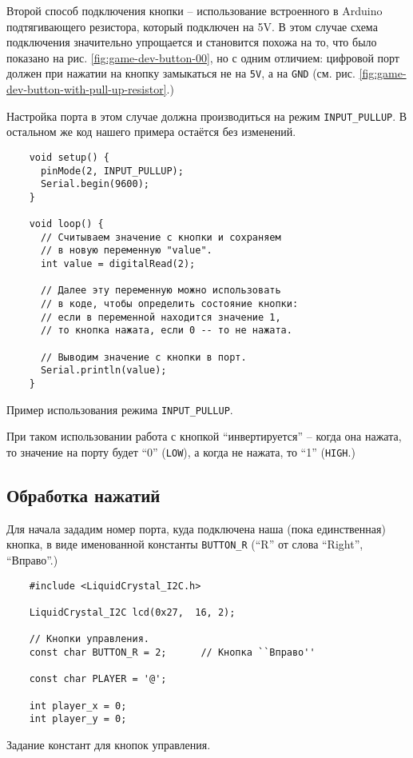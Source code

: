 \documentclass[../sparc.tex]{subfiles}
\begin{document}

Второй способ подключения кнопки -- использование встроенного в Arduino
подтягивающего резистора, который подключен на 5V.  В этом случае схема
подключения значительно упрощается и становится похожа на то, что было показано
на рис. \ref{fig:game-dev-button-00}, но с одним отличием: цифровой порт должен
при нажатии на кнопку замыкаться не на \texttt{5V}, а на \texttt{GND}
(см. рис. \ref{fig:game-dev-button-with-pull-up-resistor}.)


Настройка порта в этом случае должна производиться на режим
\texttt{INPUT\_PULLUP}.  В остальном же код нашего примера остаётся без
изменений.

\begin{listing}[H]
  \begin{verbatim}
    void setup() {
      pinMode(2, INPUT_PULLUP);
      Serial.begin(9600);
    }

    void loop() {
      // Считываем значение с кнопки и сохраняем
      // в новую переменную "value".
      int value = digitalRead(2);

      // Далее эту переменную можно использовать
      // в коде, чтобы определить состояние кнопки:
      // если в переменной находится значение 1,
      // то кнопка нажата, если 0 -- то не нажата.

      // Выводим значение с кнопки в порт.
      Serial.println(value);
    }
  \end{verbatim}
  \caption{Пример использования режима \texttt{INPUT\_PULLUP}.}
  \label{listing:game-dev-input-pullup-example}
\end{listing}

При таком использовании работа с кнопкой ``инвертируется'' -- когда она нажата,
то значение на порту будет ``0'' (\texttt{LOW}), а когда не нажата, то ``1''
(\texttt{HIGH}.)

\subsection{Обработка нажатий}

Для начала зададим номер порта, куда подключена наша (пока единственная) кнопка,
в виде именованной константы \texttt{BUTTON\_R} (``R'' от слова ``Right'',
``Вправо''.)

\begin{listing}[H]
  \begin{verbatim}
    #include <LiquidCrystal_I2C.h>

    LiquidCrystal_I2C lcd(0x27,  16, 2);

    // Кнопки управления.
    const char BUTTON_R = 2;      // Кнопка ``Вправо''

    const char PLAYER = '@';

    int player_x = 0;
    int player_y = 0;
  \end{verbatim}
  \caption{Задание констант для кнопок управления.}
  \label{listing:game-dev-button-constants}
\end{listing}
\end{document}
